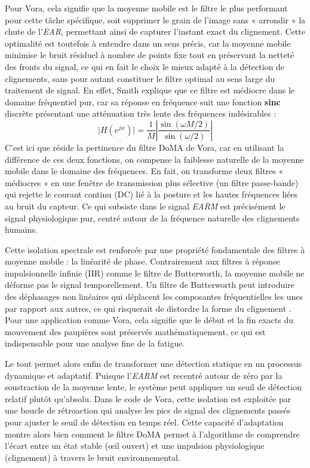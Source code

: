 \documentclass{rapportbrebeuf}
\begin{document}
Pour Vora, cela signifie que la moyenne mobile est le filtre le plus performant pour cette tâche spécifique, soit supprimer le grain de l'image sans « arrondir » la chute de l'\textit{EAR}, permettant ainsi de capturer l'instant exact du clignement. Cette optimalité est toutefois à entendre dans un sens précis, car la moyenne mobile minimise le bruit résiduel à nombre de points fixe tout en préservant la netteté des fronts du signal, ce qui en fait le choix le mieux adapté à la détection de clignements, sans pour autant constituer le filtre optimal au sens large du traitement de signal. En effet, Smith explique que ce filtre est médiocre dans le domaine fréquentiel pur, car sa réponse en fréquence suit une fonction \textbf{sinc} discrète présentant une atténuation très lente des fréquences indésirables : 
\[
  \lvert H(e^{jw}) \rvert = \frac{1}{M} \left| \frac{\sin(\omega M/2)}{\sin(\omega /2)} \right|
\]
C'est ici que réside la pertinence du filtre DoMA de Vora, car en utilisant la différence de ces deux fonctions, on compense la faiblesse naturelle de la moyenne mobile dans le domaine des fréquences. En fait, on transforme deux filtres « médiocres » en une fenêtre de transmission plus sélective (un filtre passe-bande) qui rejette le courant continu (DC) lié à la posture et les hautes fréquences liées au bruit du capteur. Ce qui subsiste dans le signal \textit{EARM} est précisément le signal physiologique pur, centré autour de la fréquence naturelle des clignements humains.

Cette isolation spectrale est renforcée par une propriété fondamentale des filtres à moyenne mobile : la linéarité de phase. Contrairement aux filtres à réponse impulsionnelle infinie (IIR) comme le filtre de Butterworth, la moyenne mobile ne déforme pas le signal temporellement. Un filtre de Butterworth peut introduire des déphasages non linéaires qui déplacent les composantes fréquentielles les unes par rapport aux autres, ce qui risquerait de distordre la forme du clignement \cite{smith1997guide}. Pour une application comme Vora, cela signifie que le début et la fin exacts du mouvement des paupières sont préservés mathématiquement, ce qui est indispensable pour une analyse fine de la fatigue.

Le tout permet alors enfin de transformer une détection statique en un processus
dynamique et adaptatif. Puisque l'\textit{EARM} est recentré autour de zéro par la soustraction de
la moyenne lente, le système peut appliquer un seuil de détection relatif plutôt qu'absolu. Dans le
code de Vora, cette isolation est exploitée par une boucle de rétroaction qui analyse les pics de
signal des clignements passés pour ajuster le seuil de détection en temps réel. Cette capacité
d'adaptation montre alors bien comment le filtre DoMA permet à l'algorithme de comprendre
l'écart entre un état stable (œil ouvert) et une impulsion physiologique (clignement) à travers le
bruit environnemental.
\end{document}
